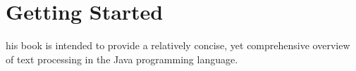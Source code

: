 \chapter{Getting Started}

his book is intended to provide a relatively concise,
yet comprehensive overview of text processing in the Java programming
language.  


